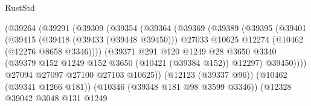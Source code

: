 \begin{lexlean}{RustStd}
\begin{coremodule}
                                      (@39264
                                        (@39291
                                          (@39309
                                            (@39354
                                              (@39364
                                                (@39369
                                                  (@39389
                                                    (@39395
                                                      (@39401
                                                        (@39415
                                                          (@39418 (@39433 (@39448 @39450)))
                                                          @27033
                                                          @10625
                                                          @12274
                                                          (@10462 (@12276 @8658 @3346))))
                                                      (@39371
                                                        @291
                                                        @120
                                                        @1249
                                                        @28
                                                        @3650
                                                        @3340
                                                        (@39379
                                                          @152
                                                          @1249
                                                          @152
                                                          @3650
                                                          (@10421 (@39384 @152))
                                                          @12297)
                                                        @39450))))
                                                @27094
                                                @27097
                                                @27100
                                                @27103
                                                @10625))
                                            (@12123 (@39337 @96))
                                            (@10462 (@39341 @1266 @181))
                                            (@10346 (@39348 @181 @98 @3599 @3346))
                                            (@12328
                                              @39042
                                              @3048
                                              @131
                                              @1249

\end{coremodule}
\end{lexlean}
